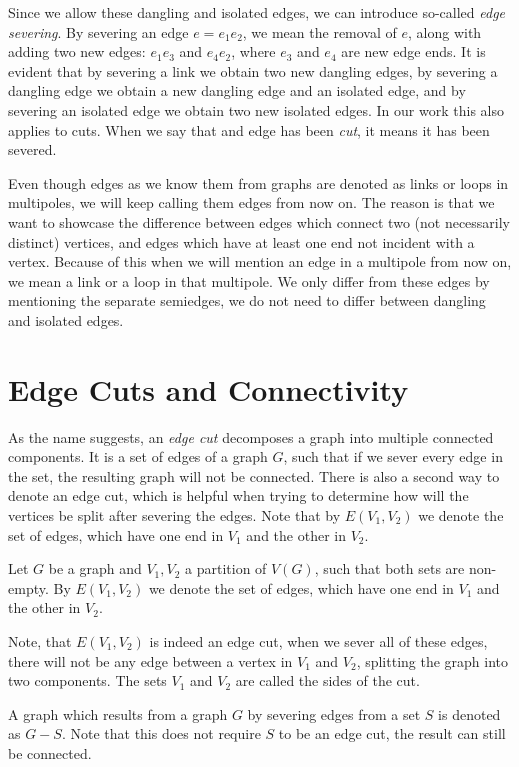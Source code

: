 \documentclass[12pt, twoside]{book}
\begin{document}
Since we allow these dangling and isolated edges, we can introduce so-called \textit{edge severing}. By severing an edge $e=e_1e_2$, we mean the removal of $e$, along with adding two new edges: $e_1e_3$ and $e_4e_2$, where $e_3$ and $e_4$ are new edge ends. It is evident that by severing a link we obtain two new dangling edges, by severing a dangling edge we obtain a new dangling edge and an isolated edge, and by severing an isolated edge we obtain two new isolated edges. In our work this also applies to cuts. When we say that and edge has been \textit{cut}, it means it has been severed.

Even though edges as we know them from graphs are denoted as links or loops in multipoles, we will keep calling them edges from now on. The reason is that we want to showcase the difference between edges which connect two (not necessarily distinct) vertices, and edges which have at least one end not incident with a vertex. Because of this when we will mention an edge in a multipole from now on, we mean a link or a loop in that multipole. We only differ from these edges by mentioning the separate semiedges, we do not need to differ between dangling and isolated edges.

\section{Edge Cuts and Connectivity}\label{sec:edge-cuts}

As the name suggests, an \textit{edge cut} decomposes a graph into multiple connected components. It is a set of edges of a graph $G$, such that if we sever every edge in the set, the resulting graph will not be connected. There is also a second way to denote an edge cut, which is helpful when trying to determine how will the vertices be split after severing the edges. Note that by $E(V_1,V_2)$ we denote the set of edges, which have one end in $V_1$ and the other in $V_2$.

Let $G$ be a graph and ${V_1,V_2}$ a partition of $V(G)$, such that both sets are non-empty. By $E(V_1,V_2)$ we denote the set of edges, which have one end in $V_1$ and the other in $V_2$.

Note, that $E(V_1,V_2)$ is indeed an edge cut, when we sever all of these edges, there will not be any edge between a vertex in $V_1$ and $V_2$, splitting the graph into two components. The sets $V_1$ and $V_2$ are called the sides of the cut.

A graph which results from a graph $G$ by severing edges from a set $S$ is denoted as $G-S$. Note that this does not require $S$ to be an edge cut, the result can still be connected.
\end{document}
